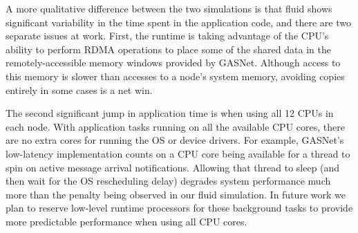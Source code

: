 A more qualitative difference between the two simulations is that fluid shows
significant variability in the time spent in the application code, and there
are two separate issues at work.  First, the runtime is taking advantage of
the CPU's ability to perform RDMA operations to place some of the shared data
in the remotely-accessible memory windows provided by GASNet.  Although access
to this memory is slower than accesses to a node's system memory,
avoiding copies entirely in some cases is a net win.

The second significant jump in application time is when using all 12 CPUs in
each node.  With application tasks running on all the available CPU cores,
there are no extra cores for running the OS or device drivers.
For example, GASNet's low-latency implementation counts on a CPU core being
available for 
a thread to spin on active message arrival notifications.  Allowing that thread to
sleep (and then wait for the OS rescheduling delay) degrades system performance
much more than the penalty being observed in our fluid simulation.  In future
work we plan to reserve low-level runtime processors for these background
tasks to provide more predictable performance when using all CPU cores.


